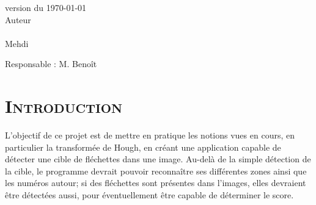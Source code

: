 \documentclass[a4paper, 11pt]{article}
\begin{document}
\begin{titlepage}
{\begin{center}
    \vspace{2mm}
    
    \large{version du \today}
    \vspace{25mm}\\
    Auteur\\~\\
    {
    \large
     Mehdi
    }
    
  \end{center}
  
  \vfill
  \begin{flushleft}
	Responsable  : M.  Benoît\\
  \end{flushleft}
}
\end{titlepage}

\clearpage


%
%

\section*{\color{unilim_red}\textsc{Introduction}}
\par
L'objectif de ce projet est de mettre en pratique les notions vues en cours, en particulier la transformée de Hough, en créant une application capable de détecter une cible de fléchettes dans une image. Au-delà de la simple détection de la cible, le programme devrait pouvoir reconnaître ses différentes zones ainsi que les numéros autour; si des fléchettes sont présentes dans l'images, elles devraient être détectées aussi, pour éventuellement être capable de déterminer le score.

\bigskip
\bigskip
\end{document}

